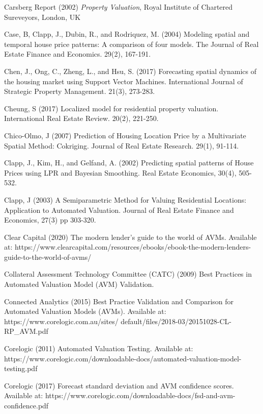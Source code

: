 \documentclass[colTwo]{anon}
\theoremstyle{definition}
\begin{document}
\begin{thebibliography}{50}
\harvarditem{}{}{}Carsberg Report (2002) \textit{Property Valuation}, Royal Institute of Chartered Sureveyors, London, UK

\harvarditem{}{}{}Case, B, Clapp, J., Dubin, R., and Rodriquez, M. (2004) Modeling spatial and temporal house price patterns: A comparison of four models. The Journal of Real Estate Finance and Economics. 29(2), 167-191. 

\harvarditem{}{}{}Chen, J., Ong, C., Zheng, L., and Hsu, S. (2017) Forecasting spatial dynamics of the housing market using Support Vector Machines. International Journal of Strategic Property Management. 21(3), 273-283. 

\harvarditem{}{}{}Cheung, S (2017) Localized model for residential property valuation. International Real Estate Review. 20(2), 221-250. 

\harvarditem{}{}{}Chico-Olmo, J (2007) Prediction of Housing Location Price by a Multivariate Spatial Method: Cokriging. Journal of Real Estate Research. 29(1), 91-114. 

\harvarditem{}{}{}Clapp, J., Kim, H., and Gelfand, A. (2002) Predicting spatial patterns of House Prices using LPR and Bayesian Smoothing. Real Estate Economics, 30(4), 505-532. 

\harvarditem{}{}{}Clapp, J (2003) A Semiparametric Method for Valuing Residential Locations: Application to Automated Valuation. Journal of Real Estate Finance and Economics, 27(3) pp 303-320. 

\harvarditem{}{}{}Clear Capital (2020) The modern lender’s guide to the world of AVMs. Available at: https://www.clearcapital.com/resources/ebooks/ebook-the-modern-lenders-guide-to-the-world-of-avms/

\harvarditem{}{}{}Collateral Assessment Technology Committee (CATC) (2009) Best Practices in Automated Valuation Model (AVM) Validation. 

\harvarditem{}{}{}Connected Analytics (2015) Best Practice Validation and Comparison for Automated Valuation Models (AVMs). Available at: https://www.corelogic.com.au/sites/ default/files/2018-03/20151028-CL-RP\_AVM.pdf

\harvarditem{}{}{}Corelogic (2011) Automated Valuation Testing. Available at: https://www.corelogic.com/downloadable-docs/automated-valuation-model-testing.pdf
		
\harvarditem{}{}{}Corelogic (2017) Forecast standard deviation and AVM confidence scores. Available at: https://www.corelogic.com/downloadable-docs/fsd-and-avm-confidence.pdf


\end{thebibliography}
\end{document}
